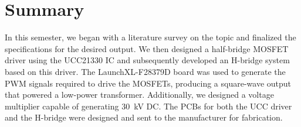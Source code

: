 \section{Summary}

In this semester, we began with a literature survey on the topic and finalized the specifications for the desired output. We then designed a half-bridge MOSFET driver using the UCC21330 IC and subsequently developed an H-bridge system based on this driver. The LaunchXL-F28379D board was used to generate the PWM signals required to drive the MOSFETs, producing a square-wave output that powered a low-power transformer. Additionally, we designed a voltage multiplier capable of generating 30~kV DC. The PCBs for both the UCC driver and the H-bridge were designed and sent to the manufacturer for fabrication.

